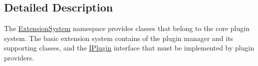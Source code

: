 \subsection{Detailed Description}
The \hyperlink{namespace_extension_system}{Extension\-System} namespace provides classes that belong to the core plugin system. The basic extension system contains of the plugin manager and its supporting classes, and the \hyperlink{class_extension_system_1_1_i_plugin}{I\-Plugin} interface that must be implemented by plugin providers. 